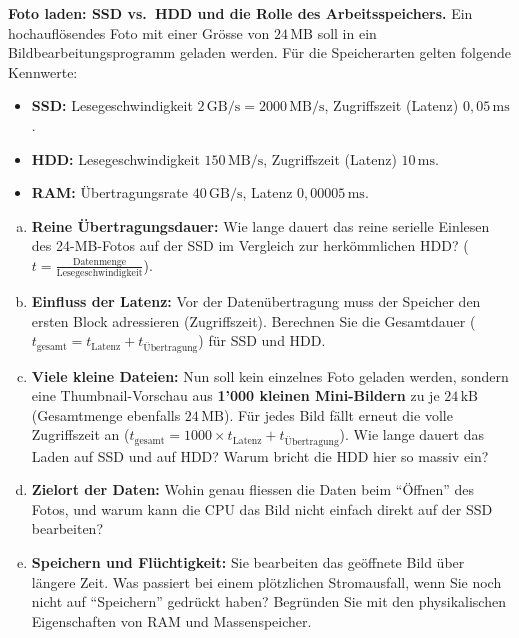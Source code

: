 \begin{myexercise}\label{myexercise:foto-laden-ssd-hdd}
    \textbf{Foto laden: \gls{SSD} vs.\ \gls{HDD} und die Rolle des Arbeitsspeichers.}
    Ein hochauflösendes Foto mit einer Grösse von $24\,\mathrm{MB}$ soll in ein Bildbearbeitungsprogramm geladen werden. Für die Speicherarten gelten folgende Kennwerte:
    \begin{itemize}
        \item \textbf{\gls{SSD}:} Lesegeschwindigkeit $2\,\mathrm{GB/s} = 2000\,\mathrm{MB/s}$, Zugriffszeit (Latenz) $0{,}05\,\mathrm{ms}$.
        \item \textbf{\gls{HDD}:} Lesegeschwindigkeit $150\,\mathrm{MB/s}$, Zugriffszeit (Latenz) $10\,\mathrm{ms}$.
        \item \textbf{\gls{RAM}:} Übertragungsrate $40\,\mathrm{GB/s}$, Latenz $0{,}00005\,\mathrm{ms}$.
    \end{itemize}

    \begin{enumerate}[(a)]
        \item \textbf{Reine Übertragungsdauer:} Wie lange dauert das reine serielle Einlesen des 24-MB-Fotos auf der \gls{SSD} im Vergleich zur herkömmlichen \gls{HDD}? ($t=\frac{\text{Datenmenge}}{\text{Lesegeschwindigkeit}}$).
        \item \textbf{Einfluss der Latenz:} Vor der Datenübertragung muss der Speicher den ersten Block adressieren (Zugriffszeit). Berechnen Sie die Gesamtdauer ($t_\text{gesamt} = t_\text{Latenz} + t_\text{Übertragung}$) für \gls{SSD} und \gls{HDD}.
        \item \textbf{Viele kleine Dateien:} Nun soll kein einzelnes Foto geladen werden, sondern eine Thumbnail-Vorschau aus \textbf{1'000 kleinen Mini-Bildern} zu je $24\,\mathrm{kB}$ (Gesamtmenge ebenfalls $24\,\mathrm{MB}$). Für jedes Bild fällt erneut die volle Zugriffszeit an ($t_\text{gesamt} = 1000 \times t_\text{Latenz} + t_\text{Übertragung}$). Wie lange dauert das Laden auf \gls{SSD} und auf \gls{HDD}? Warum bricht die \gls{HDD} hier so massiv ein?
        \item \textbf{Zielort der Daten:} Wohin genau fliessen die Daten beim \enquote{Öffnen} des Fotos, und warum kann die \gls{CPU} das Bild nicht einfach direkt auf der \gls{SSD} bearbeiten?
        \item \textbf{Speichern und Flüchtigkeit:} Sie bearbeiten das geöffnete Bild über längere Zeit. Was passiert bei einem plötzlichen Stromausfall, wenn Sie noch nicht auf \enquote{Speichern} gedrückt haben? Begründen Sie mit den physikalischen Eigenschaften von \gls{RAM} und Massenspeicher.
    \end{enumerate}


\end{myexercise}
